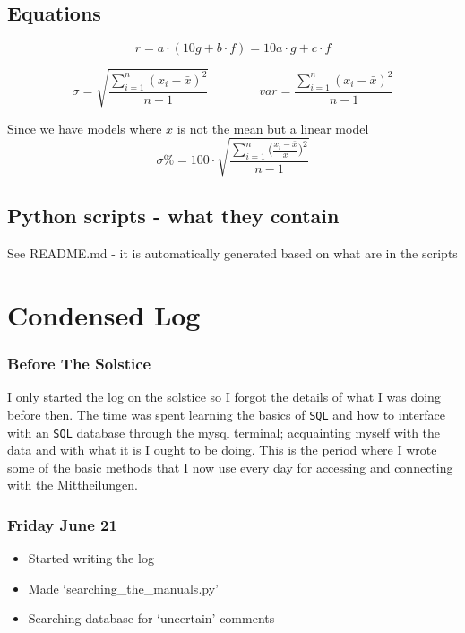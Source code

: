 \documentclass[12pt]{article}
\begin{document}
\subsection{Equations}

\begin{equation}\label{derivde equation}
    r = a\cdot(10 g + b\cdot f) = 10 a\cdot g + c\cdot f
\end{equation}

\begin{equation}\label{standard deviation equation}
    \sigma = \sqrt{\frac{\sum_{i=1}^{n} (x_i - \bar{x})^2}{n-1}}  \quad \quad \quad \quad 
    var = \frac{\sum_{i=1}^{n} (x_i - \bar{x})^2}{n-1}
\end{equation}

Since we have models where $\bar{x}$ is not the mean but a linear model
\begin{equation}\label{standard deviation percentage equation}
    \sigma\% = 100\cdot \sqrt{\frac{\sum_{i=1}^{n}\big(\frac{x_i-\bar{x}}{\bar{x}}\big)^2}{n-1}}
\end{equation}


\subsection{Python scripts - what they contain}

See README.md - it is automatically generated based on what are in the scripts


\section{Condensed Log}

\subsubsection{Before The Solstice}
I only started the log on the solstice so I forgot the details of what I was doing before then. The time was spent learning the basics of \texttt{SQL} and how to interface with an \texttt{SQL} database through the mysql terminal; acquainting myself with the data and with what it is I ought to be doing. This is the period where I wrote some of the basic methods that I now use every day for accessing and connecting with the Mittheilungen.

\subsubsection{Friday June 21}
\begin{itemize}
    \item Started writing the log
    \item Made `searching\_the\_manuals.py'
    \item Searching database for `uncertain' comments
\end{itemize}
    
\end{document}
